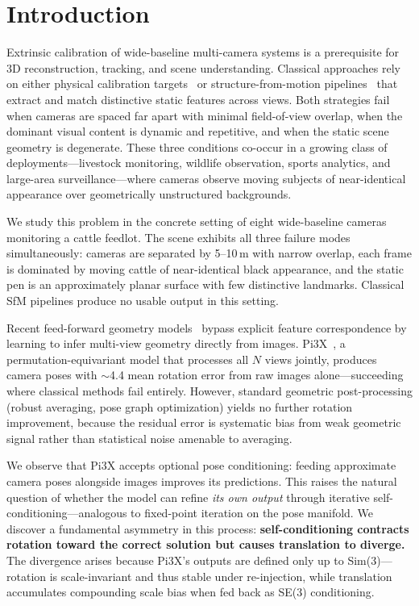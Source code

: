 \section{Introduction}
\label{sec:introduction}

Extrinsic calibration of wide-baseline multi-camera systems is a prerequisite for 3D reconstruction, tracking, and scene understanding. Classical approaches rely on either physical calibration targets~\cite{zhang2000} or structure-from-motion pipelines~\cite{schonberger2016} that extract and match distinctive static features across views. Both strategies fail when cameras are spaced far apart with minimal field-of-view overlap, when the dominant visual content is dynamic and repetitive, and when the static scene geometry is degenerate. These three conditions co-occur in a growing class of deployments---livestock monitoring, wildlife observation, sports analytics, and large-area surveillance---where cameras observe moving subjects of near-identical appearance over geometrically unstructured backgrounds.

We study this problem in the concrete setting of eight wide-baseline cameras monitoring a cattle feedlot. The scene exhibits all three failure modes simultaneously: cameras are separated by 5--10\,m with narrow overlap, each frame is dominated by moving cattle of near-identical black appearance, and the static pen is an approximately planar surface with few distinctive landmarks. Classical SfM pipelines produce no usable output in this setting.

Recent feed-forward geometry models~\cite{pi3x,vggt,dust3r} bypass explicit feature correspondence by learning to infer multi-view geometry directly from images. Pi3X~\cite{pi3x}, a permutation-equivariant model that processes all $N$ views jointly, produces camera poses with $\sim$4.4\degree{} mean rotation error from raw images alone---succeeding where classical methods fail entirely. However, standard geometric post-processing (robust averaging, pose graph optimization) yields no further rotation improvement, because the residual error is systematic bias from weak geometric signal rather than statistical noise amenable to averaging.

We observe that Pi3X accepts optional pose conditioning: feeding approximate camera poses alongside images improves its predictions. This raises the natural question of whether the model can refine \emph{its own output} through iterative self-conditioning---analogous to fixed-point iteration on the pose manifold. We discover a fundamental asymmetry in this process: \textbf{self-conditioning contracts rotation toward the correct solution but causes translation to diverge.} The divergence arises because Pi3X's outputs are defined only up to Sim(3)---rotation is scale-invariant and thus stable under re-injection, while translation accumulates compounding scale bias when fed back as SE(3) conditioning.

